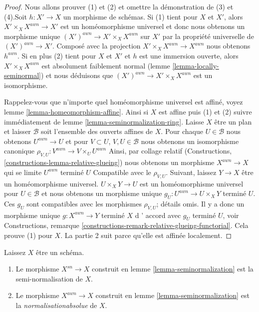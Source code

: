 \begin{proof}
Nous allons prouver (1) et (2) et omettre la démonstration de (3) et (4).Soit $h : X' \to X$ un morphisme de schémas. Si (1) tient pour $X$ et $X'$, alors $X' \times_X X^{awn} \to X'$ est un homéomorphisme universel et donc nous obtenons un morphisme unique $(X')^{awn} \to X' \times_X X^{awn}$ sur $X'$ par la propriété universelle de $(X')^{awn} \to X'$. Composé avec la projection $X' \times_X X^{awn} \to X^{awn}$ nous obtenons $h^{awn}$. Si en plus (2) tient pour $X$ et $X'$ et $h$ est une immersion ouverte, alors $X' \times_X X^{awn}$ est absolument faiblement normal (lemme \ref{lemma-locally-seminormal}) et nous déduisons que $(X')^{awn} \to X' \times_X X^{awn}$ est un isomorphisme.

\medskip\noindent

Rappelez-vous que n'importe quel homéomorphisme universel est affiné, voyez lemme \ref{lemma-homeomorphism-affine}. Ainsi si $X$ est affine puis (1) et (2) suivre immédiatement de lemme \ref{lemma-seminormalization-ring}. Laisse $X$ être un plan et laisser $\mathcal{B}$ soit l'ensemble des ouverts affines de $X$. Pour chaque $U \in \mathcal{B}$ nous obtenons $U^{awn} \to U$
et pour $V \subset U$, $V, U \in \mathcal{B}$ nous obtenons un isomorphisme canonique $\rho_{V, U} : V^{awn} \to V \times_U U^{awn}$ Ainsi, par collage relatif (Constructions, \ref{constructions-lemma-relative-glueing}) nous obtenons un morphisme $X^{awn} \to X$ qui se limite $U^{awn}$ terminé $U$ Compatible avec le $\rho_{V, U}$. Suivant, laissez $Y \to X$ être un homéomorphisme universel. $U \times_X Y \to U$ est un homéomorphisme universel pour $U \in \mathcal{B}$
et nous obtenons un morphisme unique $g_U : U^{awn} \to U \times_X Y$ terminé $U$. Ces $g_U$ sont compatibles avec les morphismes $\rho_{V, U}$; détails omis. Il y a donc un morphisme unique $g : X^{awn} \to Y$
terminé $X$ d ' accord avec $g_U$ terminé $U$, voir Constructions, remarque \ref{constructions-remark-relative-glueing-functorial}. Cela prouve (1) pour $X$. La partie 2 suit parce qu'elle est affinée localement.

\end{proof}

\begin{definition}

\label{definition-seminormalization}
Laissez $X$ être un schéma.
\begin{enumerate}
\item Le morphisme $X^{sn} \to X$ construit en lemme \ref{lemma-seminormalization} est la semi-normalisation {\it} de $X$.
\item Le morphisme $X^{awn} \to X$ construit en lemme \ref{lemma-seminormalization} est la {\it normalisationabsolue} de $X$.
\end{enumerate}

\end{definition}

